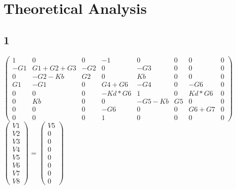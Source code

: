 \section{Theoretical Analysis}
\label{sec:analysis}


\subsection{1}

$\begin{pmatrix}
1 & 0 & 0 & -1 & 0 & 0 & 0 & 0\\
-G1 & G1+G2+G3 & -G2 & 0 & -G3 & 0 & 0 & 0\\
0 & -G2-Kb & G2 & 0 & Kb & 0 & 0 & 0 \\
G1 & -G1 & 0 & G4+G6 & -G4 & 0 & -G6 & 0\\
0 & 0 & 0 & -Kd*G6 & 1 & 0 & Kd*G6 & 0 \\
0 & Kb & 0 & 0 & -G5-Kb & G5 & 0 & 0 \\
0 & 0 & 0 & -G6 & 0 & 0 & G6+G7 & 0  \\ 
0 & 0 & 0 & 1 & 0 & 0 & 0 & 0
\end{pmatrix}$
$\begin{pmatrix}
V1\\
V2\\
V3\\
V4\\
V5\\
V6\\
V7\\
V8
\end{pmatrix}$
=
$\begin{pmatrix}
V5\\
0\\
0\\
0\\
0\\
0\\
0\\
0
\end{pmatrix}$

